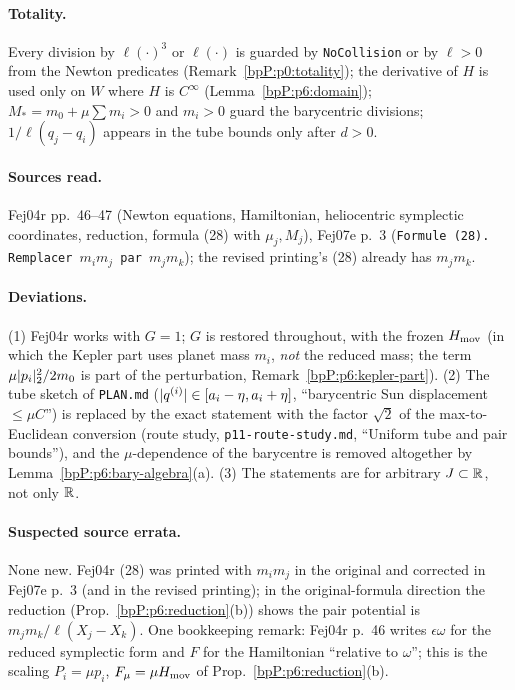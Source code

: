 \paragraph{Totality.} Every division by $\ell(\cdot)^3$ or $\ell(\cdot)$ is guarded by \texttt{NoCollision} or by $\ell>0$ from the Newton predicates (Remark~\ref{bpP:p0:totality}); the derivative of $H$ is used only on $W$ where $H$ is $C^\infty$ (Lemma~\ref{bpP:p6:domain}); $M_*=m_0+\mu\sum m_i>0$ and $m_i>0$ guard the barycentric divisions; $1/\ell(q_j-q_i)$ appears in the tube bounds only after $d>0$.

\paragraph{Sources read.} Fej04r pp.~46--47 (Newton equations, Hamiltonian, heliocentric symplectic coordinates, reduction, formula (28) with $\mu_j,M_j$), Fej07e p.~3 (\texttt{Formule (28). Remplacer $m_im_j$ par $m_jm_k$}); the revised printing's (28) already has $m_jm_k$.

\paragraph{Deviations.} (1) Fej04r works with $G=1$; $G$ is restored throughout, with the frozen $H_{\rm mov}$ (in which the Kepler part uses planet mass $m_i$, \emph{not} the reduced mass; the term $\mu\lvert p_i\rvert_2^2/2m_0$ is part of the perturbation, Remark~\ref{bpP:p6:kepler-part}). (2) The tube sketch of \texttt{PLAN.md} ($\lvert q^{(i)}\rvert\in[a_i-\eta,a_i+\eta]$, ``barycentric Sun displacement $\le\mu C$'') is replaced by the exact statement with the factor $\sqrt2$ of the max-to-Euclidean conversion (route study, \texttt{p11-route-study.md}, ``Uniform tube and pair bounds''), and the $\mu$-dependence of the barycentre is removed altogether by Lemma~\ref{bpP:p6:bary-algebra}(a). (3) The statements are for arbitrary $J\subset\mathbb{R}$, not only $\mathbb{R}$.

\paragraph{Suspected source errata.} None new. Fej04r (28) was printed with $m_im_j$ in the original and corrected in Fej07e p.~3 (and in the revised printing); in the original-formula direction the reduction (Prop.~\ref{bpP:p6:reduction}(b)) shows the pair potential is $m_jm_k/\ell(X_j-X_k)$. One bookkeeping remark: Fej04r p.~46 writes $\epsilon\omega$ for the reduced symplectic form and $F$ for the Hamiltonian ``relative to $\omega$''; this is the scaling $P_i=\mu p_i$, $F_\mu=\mu H_{\rm mov}$ of Prop.~\ref{bpP:p6:reduction}(b).

